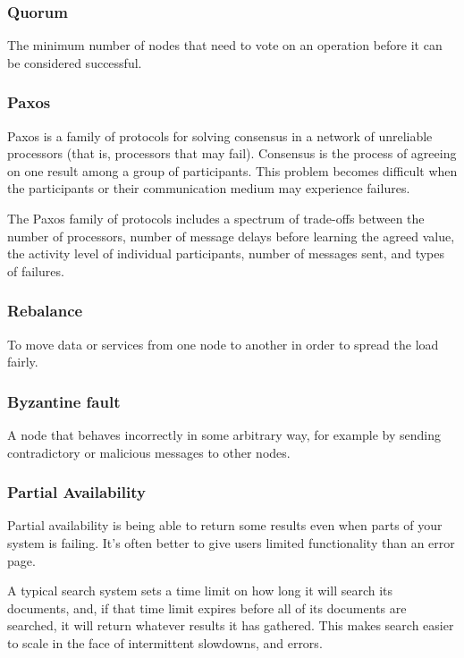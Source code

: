 \documentclass{article}
\begin{document}
    \subsubsection{Quorum}
    The minimum number of nodes that need to vote on an operation before it can be considered successful.
    
    \subsubsection{Paxos}
    Paxos is a family of protocols for solving consensus in a network of unreliable processors (that is, processors that may fail). Consensus is the process of agreeing on one result among a group of participants. This problem becomes difficult when the participants or their communication medium may experience failures.
    
    The Paxos family of protocols includes a spectrum of trade-offs between the number of processors, number of message delays before learning the agreed value, the activity level of individual participants, number of messages sent, and types of failures.
    
    \subsubsection{Rebalance}
    To move data or services from one node to another in order to spread the load fairly.
    
    \subsubsection{Byzantine fault}
    A node that behaves incorrectly in some arbitrary way, for example by sending contradictory or malicious messages to other nodes.
    
    \subsubsection{Partial Availability}
    Partial availability is being able to return some results even when parts of your system is failing. It's often better to give users limited functionality than an error page.
    
    A typical search system sets a time limit on how long it will search its documents, and, if that time limit expires before all of its documents are searched, it will return whatever results it has gathered. This makes search easier to scale in the face of intermittent slowdowns, and errors.
     
\end{document}
